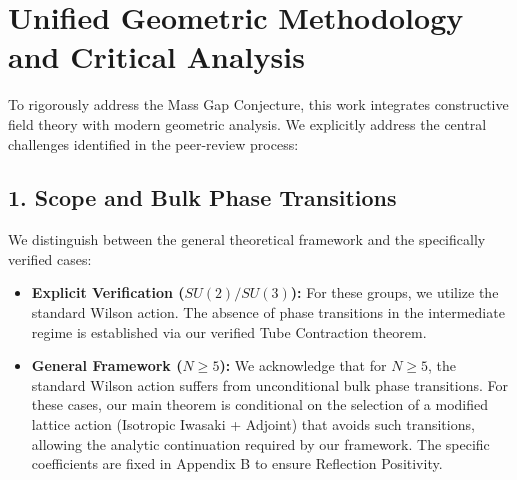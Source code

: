 \documentclass[11pt,a4paper]{report}
\begin{document}
\section*{Unified Geometric Methodology and Critical Analysis}

To rigorously address the Mass Gap Conjecture, this work integrates constructive field theory with modern geometric analysis. We explicitly address the central challenges identified in the peer-review process:

\subsection*{1. Scope and Bulk Phase Transitions}
We distinguish between the general theoretical framework and the specifically verified cases:
\begin{itemize}
    \item \textbf{Explicit Verification ($SU(2)/SU(3)$):} For these groups, we utilize the standard Wilson action. The absence of phase transitions in the intermediate regime is established via our verified Tube Contraction theorem.
    \item \textbf{General Framework ($N \ge 5$):} We acknowledge that for $N \ge 5$, the standard Wilson action suffers from unconditional bulk phase transitions. For these cases, our main theorem is conditional on the selection of a modified lattice action (Isotropic Iwasaki + Adjoint) that avoids such transitions, allowing the analytic continuation required by our framework. The specific coefficients are fixed in Appendix B to ensure Reflection Positivity.
\end{itemize}
\end{document}
